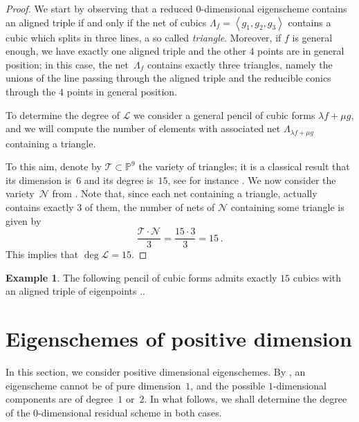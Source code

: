 \documentclass{amsart}
\theoremstyle{plain}
\theoremstyle{definition}
\newtheorem{es}[lemma]{Example}
\newcommand{\p}{\mathbb{P}}
\newcommand{\sL}{\mathcal{L}}
\begin{document}
\begin{proof}
We start by observing that a reduced $0$-dimensional eigenscheme contains an aligned triple if and only if the net of cubics
$\Lambda_f = \left\langle g_1, g_2, g_3 \right\rangle$ contains a cubic which splits in three lines, a so called \emph{triangle}. Moreover, if $f$ is general enough, we have exactly one aligned triple and the other $4$ points are in general position; in this case, the net~$\Lambda_f$ contains exactly three triangles, namely the unions of the line passing through the aligned triple and the reducible conics through the $4$ points in general position.

To determine the degree of $\sL$ we consider a general pencil of cubic forms $\lambda f + \mu g$, and we will compute the number of elements with associated net $\Lambda_{\lambda f + \mu g}$ containing a triangle.

To this aim, denote by $\mathcal{T} \subset \p^9$ the variety of triangles; it is a classical result that its dimension is~$6$ and its degree is~$15$,
see for instance \cite[Section~2.2.2]{3264}. We now consider the variety~$\mathcal{N}$ from .
Note that, since each net containing a triangle, actually contains exactly $3$ of them, the number of nets of $\mathcal{N}$ containing some triangle is given by
%
\[
  \frac{\mathcal{T} \cdot \mathcal{N}}{3} = \frac{{15} \cdot {3}}{3} = 15 \,.
\]
%
This implies that $\deg \sL = 15$.
\end{proof}

\begin{es}
The following pencil of cubic forms admits exactly $15$ cubics with an aligned triple of eigenpoints ..
\end{es}


\section{Eigenschemes of positive dimension}
\label{positive_dim}

In this section, we consider positive dimensional eigenschemes.
By \cite{BGV}, an eigenscheme cannot be of pure dimension~$1$, and the possible $1$-dimensional components are of degree~$1$ or~$2$.
In what follows, we shall determine the degree of the $0$-dimensional residual scheme in both cases.
\end{document}
